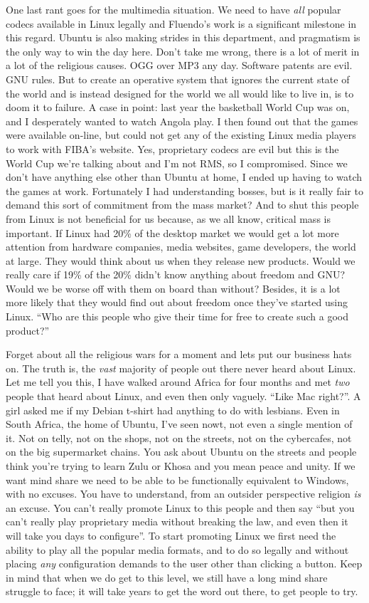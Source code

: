 \documentclass{memoir}
\begin{document}
One last rant goes for the multimedia situation. We need to have
\emph{all} popular codecs available in Linux legally and Fluendo's
work is a significant milestone in this regard. Ubuntu is also making
strides in this department, and pragmatism is the only way to win the
day here. Don't take me wrong, there is a lot of merit in a lot of the
religious causes. OGG over MP3 any day. Software patents are evil. GNU
rules. But to create an operative system that ignores the current
state of the world and is instead designed for the world we all would
like to live in, is to doom it to failure. A case in point: last year
the basketball World Cup was on, and I desperately wanted to watch
Angola play. I then found out that the games were available on-line,
but could not get any of the existing Linux media players to work with
FIBA's website. Yes, proprietary codecs are evil but this is the World
Cup we're talking about and I'm not RMS, so I compromised. Since we
don't have anything else other than Ubuntu at home, I ended up having
to watch the games at work. Fortunately I had understanding bosses,
but is it really fair to demand this sort of commitment from the mass
market? And to shut this people from Linux is not beneficial for us
because, as we all know, critical mass is important. If Linux had 20\%
of the desktop market we would get a lot more attention from hardware
companies, media websites, game developers, the world at large. They
would think about us when they release new products. Would we really
care if 19\% of the 20\% didn't know anything about freedom and GNU?
Would we be worse off with them on board than without? Besides, it is
a lot more likely that they would find out about freedom once they've
started using Linux. ``Who are this people who give their time for free
to create such a good product?''

Forget about all the religious wars for a moment and lets put our
business hats on. The truth is, the \emph{vast} majority of people out
there never heard about Linux. Let me tell you this, I have walked
around Africa for four months and met \emph{two} people that heard
about Linux, and even then only vaguely. ``Like Mac right?''. A girl
asked me if my Debian t-shirt had anything to do with lesbians. Even
in South Africa, the home of Ubuntu, I've seen nowt, not even a single
mention of it. Not on telly, not on the shops, not on the streets, not
on the cybercafes, not on the big supermarket chains. You ask about
Ubuntu on the streets and people think you're trying to learn Zulu or
Khosa and you mean peace and unity. If we want mind share we need to
be able to be functionally equivalent to Windows, with no excuses. You
have to understand, from an outsider perspective religion \emph{is} an
excuse. You can't really promote Linux to this people and then say
``but you can't really play proprietary media without breaking the law,
and even then it will take you days to configure''. To start promoting
Linux we first need the ability to play all the popular media formats,
and to do so legally and without placing \emph{any} configuration
demands to the user other than clicking a button. Keep in mind that
when we do get to this level, we still have a long mind share struggle
to face; it will take years to get the word out there, to get people
to try.
\end{document}
